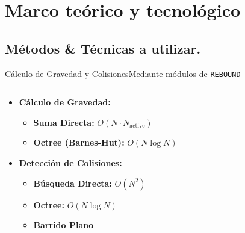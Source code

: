 \section[Marco del TT]{Marco teórico y tecnológico}
\subsection[Métodos \& Técnicas]{Métodos \& Técnicas a utilizar.}

\begin{frame}{Cálculo de Gravedad y Colisiones}{Mediante módulos de \texttt{REBOUND}}
    \begin{columns}
        \begin{column}{0.6\textwidth}
            \small
            \begin{itemize}
                \item \textbf{Cálculo de Gravedad:}
                \begin{itemize}
                    \item \textbf{Suma Directa:} $O(N \cdot N_{\text{active}})$
                    \item \textbf{Octree (Barnes-Hut):} $O(N \log N)$
                \end{itemize}
                \item \textbf{Detección de Colisiones:}
                \begin{itemize}
                    \item \textbf{Búsqueda Directa:} $O(N^2)$
                    \item \textbf{Octree:} $O(N \log N)$
                    \item \textbf{Barrido Plano}
                \end{itemize}
            \end{itemize}
        \end{column}
        \begin{column}{0.4\textwidth}
            \centering
            \begin{figure}[H]
                \centering
\end{figure}
\end{column}
\end{columns}
\end{frame}
